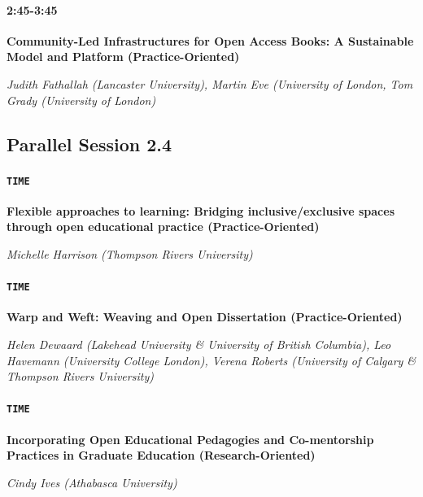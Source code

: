 \documentclass[
]{book}
\begin{document}
\begin{secondary}
\hypertarget{section}{%
\paragraph*{2:45-3:45}\label{section}}

\textbf{Community-Led Infrastructures for Open Access Books: A
Sustainable Model and Platform (Practice-Oriented)}

\emph{Judith Fathallah (Lancaster University), Martin Eve (University of
London, Tom Grady (University of London)}
\end{secondary}

\hypertarget{parallel-session-2.4}{%
\subsection*{Parallel Session 2.4}\label{parallel-session-2.4}}

\begin{secondary}
\hypertarget{time}{%
\paragraph{\texorpdfstring{\texttt{TIME}}{TIME}}\label{time}}

\textbf{Flexible approaches to learning: Bridging inclusive/exclusive
spaces through open educational practice (Practice-Oriented)}

\emph{Michelle Harrison (Thompson Rivers University)}
\end{secondary}

\begin{secondary}
\hypertarget{time}{%
\paragraph{\texorpdfstring{\texttt{TIME}}{TIME}}\label{time}}

\textbf{Warp and Weft: Weaving and Open Dissertation
(Practice-Oriented)}

\emph{Helen Dewaard (Lakehead University \& University of British
Columbia), Leo Havemann (University College London), Verena Roberts
(University of Calgary \& Thompson Rivers University)}
\end{secondary}

\begin{secondary}
\hypertarget{time}{%
\paragraph{\texorpdfstring{\texttt{TIME}}{TIME}}\label{time}}

\textbf{Incorporating Open Educational Pedagogies and Co-mentorship
Practices in Graduate Education (Research-Oriented)}

\emph{Cindy Ives (Athabasca University)}
\end{secondary}
\end{document}
